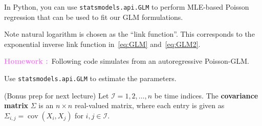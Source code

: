 \documentclass[a4paper,11pt]{exam}
\newif\ifMATLAB %
\DeclareMathOperator*{\cov}{cov}
\newcounter{homework}
\newcommand{\homework}{\stepcounter{homework}\textcolor{violet}{\textbf{Homework \thehomework:}~}}
\begin{document}
\begin{questions}

\else
In Python, you can use \texttt{statsmodels.api.GLM} to perform MLE-based Poisson regression that can be used to fit our GLM formulations.

%
\fi

Note natural logarithm is chosen as the ``link function''. This corresponds to the exponential inverse link function in~\eqref{eq:GLM} and~\eqref{eq:GLM2}.

\question \homework Following code simulates from an autoregressive Poisson-GLM.
\ifMATLAB
    Use \texttt{glmfit} to estimate the parameters.
    
\else
    Use \texttt{statsmodels.api.GLM} to estimate the parameters.
\fi



\newpage
\question (Bonus prep for next lecture) Let $\mathcal{I} = {1, 2, \ldots, n}$ be time indices. The \textbf{covariance matrix} $\Sigma$ is an $n \times n$ real-valued matrix, where each entry is given as $\Sigma_{i,j} = \cov(X_i, X_j)$ for $i, j \in \mathcal{I}$.
\end{questions}
\end{document}
